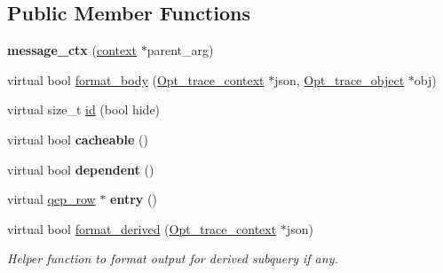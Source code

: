 \subsection*{Public Member Functions}
\begin{DoxyCompactItemize}
\item 
\mbox{\label{classopt__explain__json__namespace_1_1message__ctx_a3e9e3db68a28656d218947d041e739a4}} 
{\bfseries message\+\_\+ctx} (\mbox{\hyperlink{classopt__explain__json__namespace_1_1context}{context}} $\ast$parent\+\_\+arg)
\item 
virtual bool \mbox{\hyperlink{classopt__explain__json__namespace_1_1message__ctx_aaad801a247c7103078a058661f4084ce}{format\+\_\+body}} (\mbox{\hyperlink{classOpt__trace__context}{Opt\+\_\+trace\+\_\+context}} $\ast$json, \mbox{\hyperlink{classOpt__trace__object}{Opt\+\_\+trace\+\_\+object}} $\ast$obj)
\item 
virtual size\+\_\+t \mbox{\hyperlink{classopt__explain__json__namespace_1_1message__ctx_a76f2d4b59c3707aa67afef272d4a00ca}{id}} (bool hide)
\item 
\mbox{\label{classopt__explain__json__namespace_1_1message__ctx_a9d10990132f844be70ad9ffa6f9126ac}} 
virtual bool {\bfseries cacheable} ()
\item 
\mbox{\label{classopt__explain__json__namespace_1_1message__ctx_a473c81c421b4a73d2b82ce3b50c8c3c1}} 
virtual bool {\bfseries dependent} ()
\item 
\mbox{\label{classopt__explain__json__namespace_1_1message__ctx_a0241da502aedac8fd31a2c886e498183}} 
virtual \mbox{\hyperlink{classqep__row}{qep\+\_\+row}} $\ast$ {\bfseries entry} ()
\item 
\mbox{\label{classopt__explain__json__namespace_1_1message__ctx_a63148dccbb51f9491ba72d8839983e41}} 
virtual bool \mbox{\hyperlink{classopt__explain__json__namespace_1_1message__ctx_a63148dccbb51f9491ba72d8839983e41}{format\+\_\+derived}} (\mbox{\hyperlink{classOpt__trace__context}{Opt\+\_\+trace\+\_\+context}} $\ast$json)
\begin{DoxyCompactList}\small\item\em Helper function to format output for derived subquery if any. \end{DoxyCompactList}\item 

\end{DoxyCompactItemize}
